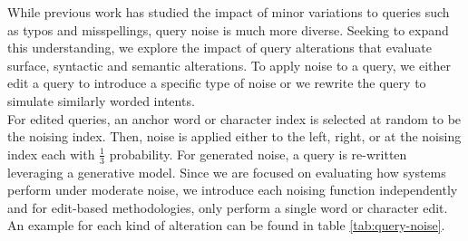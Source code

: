 While previous work has studied the impact of minor variations to queries such as typos and misspellings, query noise is much more diverse. Seeking to expand this understanding, we explore the impact of query alterations that evaluate surface, syntactic and semantic alterations. To apply noise to a query, we either edit a query to introduce a specific type of noise or we rewrite the query to simulate similarly worded intents. \\
For edited queries, an anchor word or character index is selected at random to be the noising index. Then, noise is applied either to the left, right, or at the noising index each with $\frac{1}{3}$ probability. For generated noise, a query is re-written leveraging a generative model. Since we are focused on evaluating how systems perform under moderate noise, we introduce each noising function independently and for edit-based methodologies, only perform a single word or character edit. An example for each kind of alteration can be found in table \ref{tab:query-noise}. \\

